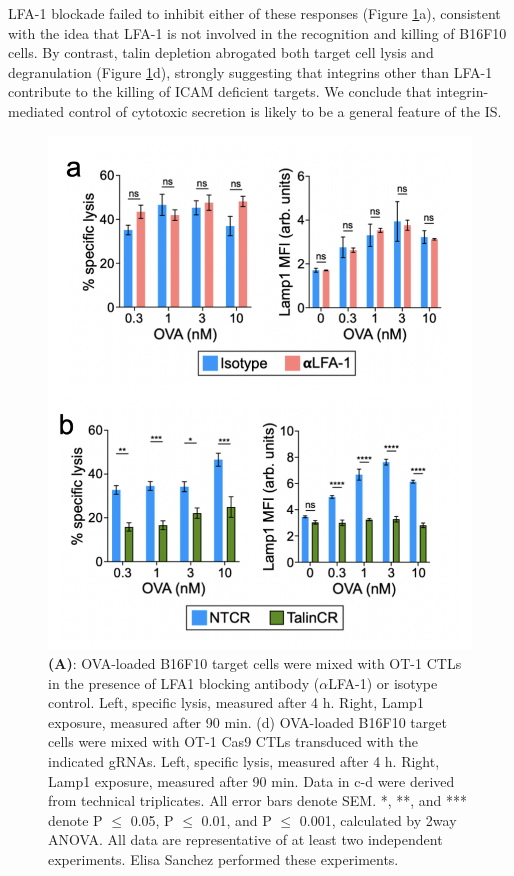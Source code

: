 LFA-1 blockade failed to inhibit either of these responses (Figure \ref{fig:fig5assays}a), consistent with the idea that LFA-1 is not involved in the recognition and killing of B16F10 cells. By contrast, talin depletion abrogated both target cell lysis and degranulation (Figure \ref{fig:fig5assays}d), strongly suggesting that integrins other than LFA-1 contribute to the killing of ICAM deficient targets. We conclude that integrin-mediated control of cytotoxic secretion is likely to be a general feature of the IS.

\begin{figure}[htbp]
	\centering
	\includegraphics[width=1.0\columnwidth]{../figures/chapter3/fig5assays.png}
	\caption{Talin, but not LFA-1, is required for CTL-mediated killing of B16F10 cells.}
	\caption*{\textbf{(A)}: OVA-loaded B16F10 target cells were mixed with OT-1 CTLs in the presence of LFA1 blocking antibody ($\alpha$LFA-1) or isotype control. Left, specific lysis, measured after 4 h. Right, Lamp1 exposure, measured after 90 min. (d) OVA-loaded B16F10 target cells were mixed with OT-1 Cas9 CTLs transduced with the indicated gRNAs. Left, specific lysis, measured after 4 h. Right, Lamp1 exposure, measured after 90 min. Data in c-d were derived from technical triplicates. All error bars denote SEM. *, **, and *** denote P $\leq$ 0.05, P $\leq$ 0.01, and P $\leq$ 0.001, calculated by 2way ANOVA. All data are representative of at least two independent experiments. Elisa Sanchez performed these experiments.}
	\label{fig:fig5assays}
\end{figure} 


